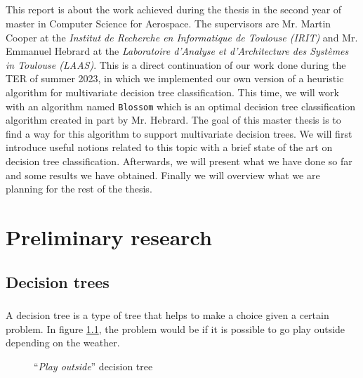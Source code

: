 \documentclass[12pt]{report}
\theoremstyle{definition}
\theoremstyle{definition}
\theoremstyle{definition}
\begin{document}
\paragraph{} This report is about the work achieved during the thesis in the second year of master in Computer
Science for Aerospace. The supervisors are Mr. Martin Cooper at the \textit{Institut de Recherche en Informatique
de Toulouse (IRIT)} and Mr. Emmanuel Hebrard at the \textit{Laboratoire d'Analyse et d'Architecture des Systèmes
in Toulouse (LAAS)}. This is a direct continuation of our work done during the TER of summer 2023, in which we
implemented our own version of a heuristic algorithm for multivariate decision tree classification. This time,
we will work with an algorithm named \texttt{Blossom} which is an optimal decision tree classification algorithm
created in part by Mr. Hebrard. The goal of this master thesis is to find a way for this algorithm to support
multivariate decision trees. We will first introduce useful notions related to this topic with a brief state
of the art on decision tree classification. Afterwards, we will present what we have done so far and some
results we have obtained. Finally we will overview what we are planning for the rest of the thesis.



\chapter{Preliminary research}
\section{Decision trees}
\paragraph{} A decision tree is a type of tree that helps to make a choice given a certain problem. In figure
\ref{fig:tree}, the problem would be if it is possible to go play outside depending on the weather.

\begin{figure}[ht]
    \centering
    \caption{``\textit{Play outside}'' decision tree}
    \label{fig:tree}
\end{figure}
\end{document}
